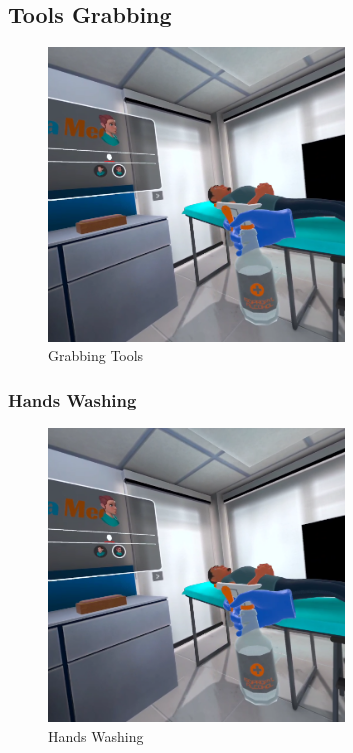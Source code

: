 \subsection{Tools Grabbing}
\begin{figure}[h]
	\centering
	\includegraphics[width=0.7\textwidth, height=0.3\textheight]{Images/Grabbing Tool.png}
	\caption{Grabbing Tools}
	\label{fig:Grabbing-Tool}
\end{figure}
\newpage
\subsubsection{Hands Washing}
\begin{figure}[h]
	\centering
     \includegraphics[width=0.7\textwidth, height=0.3\textheight]{Images/Washing hands.png}
	\caption{Hands Washing}
	\label{fig:Hands Washing}
\end{figure}

